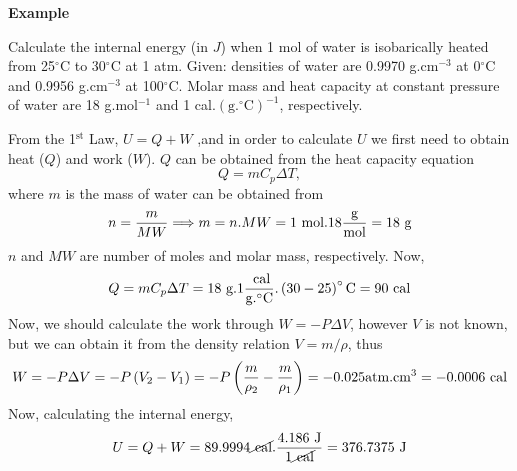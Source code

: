    \begin{MyExample}{\begin{center}{\bf Example}\end{center}}
     \begin{example}\label{Chapter:FirstLaw:Example3}
       Calculate the internal energy (in $J$) when 1 mol of water is isobarically heated from 25$^{\circ}$C to 30$^{\circ}$C at 1 atm. Given: densities of water are 0.9970 g.cm$^{-3}$ at 0$^{\circ}$C and 0.9956 g.cm$^{-3}$ at 100$^{\circ}$C. Molar mass and heat capacity at constant pressure of water are 18 g.mol$^{-1}$ and 1 cal.$\left(\text{g.}^{\circ}\text{C}\right)^{-1}$, respectively.
     \end{example}
     
        From the 1$^{\text{st}}$ Law, $U=Q+W$ ,and in order to calculate $U$ we first need to obtain heat ($Q$) and work ($W$). $Q$ can be obtained from the heat capacity equation
          \begin{displaymath}
             Q = m C_{p} \Delta T,
          \end{displaymath}  
          where $m$ is the mass of water can be obtained from
          \begin{displaymath}
             n = \displaystyle\frac{m}{MW} \Longrightarrow  m = n.MW = 1\text{ mol} . 18 \displaystyle\frac{\text{g}}{\text{mol}} = 18 \text{ g}
          \end{displaymath}
          $n$ and $MW$ are number of moles and molar mass, respectively. Now,
          \begin{displaymath}
             Q = m C_{p} \Delta T = 18\text{ g} . 1 \displaystyle\frac{\text{ cal}}{\text{g.}^{\circ}\text{C}}.\left(30-25\right)^{\circ}\text{C} = 90\text{ cal}
          \end{displaymath}  
          Now, we should calculate the work through $W=-P\Delta V$, however $V$ is not known, but we can obtain it from the density relation $V=m/\rho$, thus
          \begin{displaymath}
             W = - P\Delta V = -P\left(V_{2}-V_{1}\right) = -P\left(\displaystyle\frac{m}{\rho_{2}} - \displaystyle\frac{m}{\rho_{1}}\right) = -0.025\text{atm.cm}^{3} = -0.0006\text{ cal} 
          \end{displaymath}
          Now, calculating the internal energy,
          \begin{displaymath}
             U = Q + W = 89.9994\cancel{\text{ cal}} . \displaystyle\frac{ 4.186\text{ J}}{1\cancel{\text{ cal}}} = 376.7375 \text{ J}
          \end{displaymath}
   \end{MyExample}


